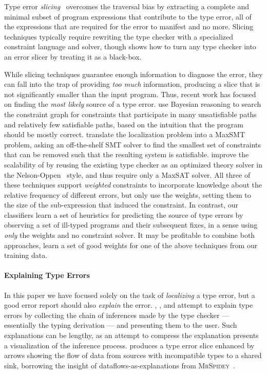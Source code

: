 Type error \emph{slicing}~\citep{Haack2003-vc,Tip2001-qp,Rahli2010-ps}
overcomes the traversal bias by extracting a complete and minimal subset
of program expressions that contribute to the type error, \ie all of the
expressions that are required for the error to manifest and no more.
%
Slicing techniques typically require rewriting the type checker with a
specialized constraint language and solver, though
\citet{Schilling2011-yf} shows how to turn any type checker into an
error slicer by treating it as a black-box.

While slicing techniques guarantee enough information to diagnose the
error, they can fall into the trap of providing \emph{too much}
information, producing a slice that is not significantly smaller than
the input program.
%
Thus, recent work has focused on finding the \emph{most likely} source
of a type error.
%
\citet{Zhang2014-lv} use Bayesian reasoning to search the constraint
graph for constraints that participate in many unsatisfiable paths and
relatively few satisfiable paths, based on the intuition that the
program should be mostly correct.
%
\citet{Pavlinovic2014-mr} translate the localization problem into a
MaxSMT problem, asking an off-the-shelf SMT solver to find the smallest
set of constraints that can be removed such that the resulting system is
satisfiable.
%
\citet{Loncaric2016-uk} improve the scalability of
\citeauthor{Pavlinovic2014-mr} by reusing the existing type checker as
an optimized theory solver in the Nelson-Oppen~\citeyear{Nelson1979-td}
style, and thus require only a MaxSAT solver.
%
All three of these techniques support \emph{weighted} constraints to
incorporate knowledge about the relative frequency of different errors,
but only \citeauthor{Pavlinovic2014-mr} use the weights, setting them to
the size of the sub-expression that induced the constraint.
%
In contrast, our classifiers learn a set of heuristics for predicting
the source of type errors by observing a set of ill-typed programs and
their subsequent fixes, in a sense using \emph{only} the weights and no
constraint solver.
%
It may be profitable to combine both approaches, \ie learn a set of good
weights for one of the above techniques from our training data.

\paragraph{Explaining Type Errors}
In this paper we have focused solely on the task of \emph{localizing} a
type error, but a good error report should also \emph{explain} the
error.
%
\citet{Wand1986-nw}, \citet{Beaven1993-hb}, and \citet{Duggan1996-by}
attempt to explain type errors by collecting the chain of inferences
made by the type checker --- essentially the typing derivation --- and
presenting them to the user.
%
Such explanations can be lengthy, as an attempt to compress the
explanation \citet{Yang2000-kz} presents a visualization of the
inference process.
%
\citet{Gast2004-zd} produces a type error slice enhanced by arrows
showing the flow of data from sources with incompatible types to a
shared sink, borrowing the insight of dataflows-as-explanations from
\textsc{MrSpidey}~\citep{Flanagan1996-bu}.

